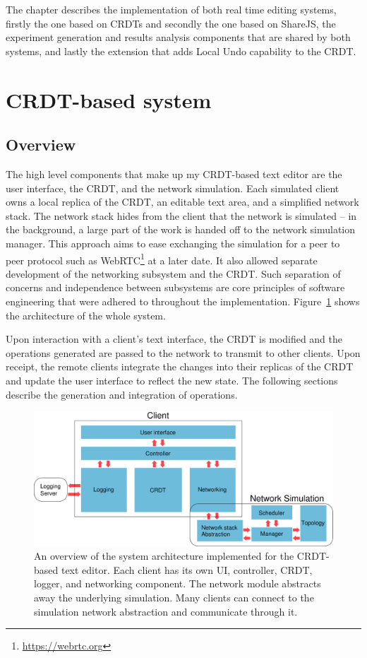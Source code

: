 \documentclass[12pt,a4paper,twoside,openright]{report}
\begin{document}
The chapter describes the implementation of both real time editing systems, firstly the one based on CRDTs and secondly the one based on ShareJS, the experiment generation and results analysis components that are shared by both systems, and lastly the extension that adds Local Undo capability to the CRDT.


\section{CRDT-based system} \label{sec:crdt}

	\subsection{Overview}
	The high level components that make up my CRDT-based text editor are the user interface, the CRDT, and the network simulation. Each simulated client owns a local replica of the CRDT, an editable text area, and a simplified network stack. The network stack hides from the client that the network is simulated -- in the background, a large part of the work is handed off to the network simulation manager. This approach aims to ease exchanging the simulation for a peer to peer protocol such as WebRTC\footnote{\url{https://webrtc.org}} at a later date. It also allowed separate development of the networking subsystem and the CRDT. Such separation of concerns and independence between subsystems are core principles of software engineering that were adhered to throughout the implementation. Figure~\ref{fig:sysarch} shows the architecture of the whole system. 
	
	Upon interaction with a client's text interface, the CRDT is modified and the operations generated are passed to the network to transmit to other clients. Upon receipt, the remote clients integrate the changes into their replicas of the CRDT and update the user interface to reflect the new state. The following sections describe the generation and integration of operations.
	
	\begin{figure}[H]
		\centering
		\includegraphics[width=1\linewidth]{figs/sysarch.eps}
		\caption[System Architecture]{An overview of the system architecture implemented for the CRDT-based text editor. Each client has its own UI, controller, CRDT, logger, and networking component. The network module abstracts away the underlying simulation. Many clients can connect to the simulation network abstraction and communicate through it.}
		\label{fig:sysarch}
	\end{figure}
	
\end{document}
